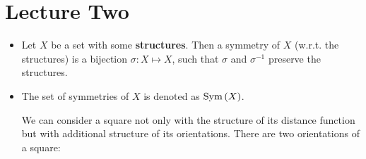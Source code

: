 \section{Lecture Two}
\begin{itemize}
    \item Let $X$ be a set with some \textbf{structures}. Then a symmetry of $X$ (w.r.t. the structures) is a bijection $\sigma:X\mapsto X$, such that $\sigma$ and $\sigma^{-1}$ preserve the structures.
    \item The set of symmetries of $X$ is denoted as $\mathrm{Sym}\,(X)$.
    \begin{example}
        We can consider a square not only with the structure of its distance function but with additional structure of its orientations. There are two orientations of a square:
        \begin{center}
\end{center}
\end{example}
\end{itemize}
